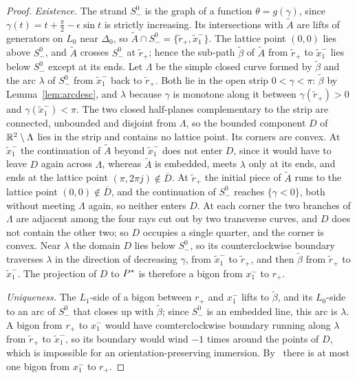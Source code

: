 \begin{proof}
\emph{Existence.} The strand $S^0_-$ is the graph of a function $\theta=g(\gamma)$, since $\gamma(t)=t+\frac\pi2-\epsilon\sin t$ is
strictly increasing. Its intersections with $\tilde A$ are lifts of generators on $L_0$ near $\Delta_0$, so
$\tilde A\cap S^0_-=\{\tilde r_+,\tilde x_1^-\}$. The lattice point $(0,0)$ lies above $S^0_-$, and $\tilde A$ crosses $S^0_-$ at
$\tilde r_+$; hence the sub-path $\tilde\beta$ of $\tilde A$ from $\tilde r_+$ to $\tilde x_1^-$ lies below $S^0_-$ except at its ends. Let
$\Lambda$ be the simple closed curve formed by $\tilde\beta$ and the arc $\lambda$ of $S^0_-$ from $\tilde x_1^-$ back to $\tilde r_+$.
Both lie in the open strip $0<\gamma<\pi$: $\tilde\beta$ by Lemma~\ref{lem:arcdesc}, and $\lambda$ because $\gamma$ is monotone
along it between $\gamma(\tilde r_+)>0$ and $\gamma(\tilde x_1^-)<\pi$. The two closed half-planes complementary to the
strip are connected, unbounded and disjoint from $\Lambda$, so the bounded component $D$ of $\mathbb{R}^2\setminus\Lambda$ lies in
the strip and contains no lattice point. Its corners are convex. At $\tilde x_1^-$ the continuation of $\tilde A$
beyond $\tilde x_1^-$ does not enter $D$, since it would have to leave $D$ again across $\Lambda$, whereas $\tilde A$ is
embedded, meets $\lambda$ only at its ends, and ends at the lattice point $(\pi,2\pi j)\notin\overline D$. At $\tilde r_+$ the
initial piece of $\tilde A$ runs to the lattice point $(0,0)\notin\overline D$, and the continuation of $S^0_-$ reaches
$\{\gamma<0\}$, both without meeting $\Lambda$ again, so neither enters $D$. At each corner the two branches of $\Lambda$
are adjacent among the four rays cut out by two transverse curves, and $D$ does not contain the other two;
so $D$ occupies a single quarter, and the corner is convex. Near $\lambda$ the domain $D$ lies below $S^0_-$, so its
counterclockwise boundary traverses $\lambda$ in the direction of decreasing $\gamma$, from $\tilde x_1^-$ to $\tilde r_+$, and then
$\tilde\beta$ from $\tilde r_+$ to $\tilde x_1^-$. The projection of $D$ to $P^{*}$ is therefore a bigon from $x_1^-$ to $r_+$.

\emph{Uniqueness.} The $L_1$-side of a bigon between $r_+$ and $x_1^-$ lifts to $\tilde\beta$, and its $L_0$-side to an
arc of $S^0_-$ that closes up with $\tilde\beta$; since $S^0_-$ is an embedded line, this arc is $\lambda$. A bigon from
$r_+$ to $x_1^-$ would have counterclockwise boundary running along $\lambda$ from $\tilde r_+$ to $\tilde x_1^-$, so its
boundary would wind $-1$ times around the points of $D$, which is impossible for an orientation-preserving
immersion. By~\cite[Cor.~3.13]{HHK2} there is at most one bigon from $x_1^-$ to $r_+$.
\end{proof}

